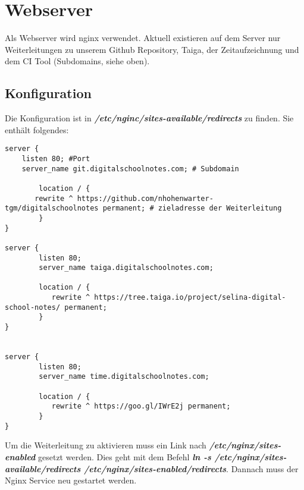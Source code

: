 \documentclass[12pt,a4paper,oneside,ngerman]{scrartcl}
\begin{document}
\section{Webserver}
Als Webserver wird nginx verwendet. Aktuell existieren auf dem Server nur Weiterleitungen zu unserem Github Repository, Taiga, der Zeitaufzeichnung und dem CI Tool (Subdomains, siehe oben).

\subsection{Konfiguration}
Die Konfiguration ist in \textbf{\textit{/etc/nginc/sites-available/redirects}} zu finden. Sie enthält folgendes:

\begin{lstlisting}
server {
	listen 80; #Port
	server_name git.digitalschoolnotes.com; # Subdomain

    	location / {
	   rewrite ^ https://github.com/nhohenwarter-tgm/digitalschoolnotes permanent; # zieladresse der Weiterleitung
    	}
}

server {
        listen 80;
        server_name taiga.digitalschoolnotes.com;

        location / {
           rewrite ^ https://tree.taiga.io/project/selina-digital-school-notes/ permanent;
        }
}


server {
        listen 80;
        server_name time.digitalschoolnotes.com;

        location / {
           rewrite ^ https://goo.gl/IWrE2j permanent;
        }
}

\end{lstlisting}

Um die Weiterleitung zu aktivieren muss ein Link nach \textbf{\textit{/etc/nginx/sites-enabled}} gesetzt werden. Dies geht mit dem Befehl \textbf{\textit{ln -s /etc/nginx/sites-available/redirects /etc/nginx/sites-enabled/redirects}}. Dannach muss der Nginx Service neu gestartet werden.

 



\end{document}
